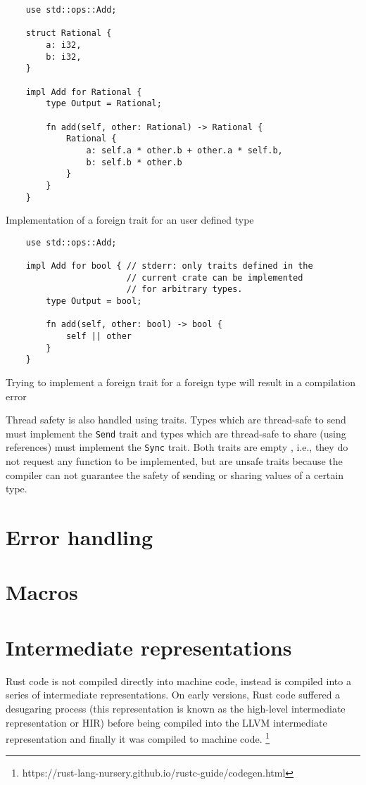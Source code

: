 \begin{listing}
	\begin{verbatim}
    use std::ops::Add;

    struct Rational {
        a: i32,
        b: i32,
    }

    impl Add for Rational {
        type Output = Rational;
        
        fn add(self, other: Rational) -> Rational {
            Rational {
                a: self.a * other.b + other.a * self.b,
                b: self.b * other.b
            }
        }
    }
    \end{verbatim}
  \caption{Implementation of a foreign trait for an user defined type}
  \label{lst:foreign_trait_impl}
\end{listing}

\begin{listing}
	\begin{verbatim}
    use std::ops::Add;

    impl Add for bool { // stderr: only traits defined in the
                        // current crate can be implemented 
                        // for arbitrary types.
        type Output = bool;
        
        fn add(self, other: bool) -> bool {
            self || other
        }
    }
    \end{verbatim}
  \caption{Trying to implement a foreign trait for a foreign type will result in a compilation error}
  \label{lst:foreign_trait_foreign_impl}
\end{listing}
Thread safety is also handled using traits. Types which are thread-safe to send must implement the \texttt{Send} trait and types which are thread-safe to share (using references) must implement the \texttt{Sync} trait. Both traits are empty , i.e., they do not request any function to be implemented, but are unsafe traits because the compiler can not guarantee the safety of sending or sharing values of a certain type.

\section{Error handling}
\section{Macros}
\section{Intermediate representations}
Rust code is not compiled directly into machine code, instead is compiled into a series of intermediate representations. On early versions, Rust code suffered a desugaring process (this representation is known as the high-level intermediate representation or HIR) before being compiled into the LLVM intermediate representation and finally it was compiled to machine code. \footnote{https://rust-lang-nursery.github.io/rustc-guide/codegen.html}

